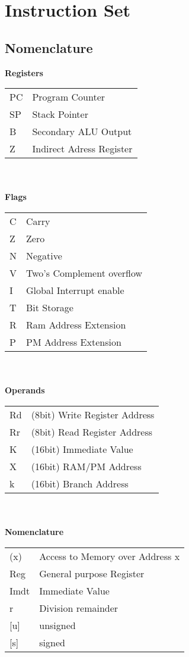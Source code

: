 \newpage
{}
\section{Instruction Set} \label{section:instruction-set}
\subsection{Nomenclature}
\begin{doublespace}
    \textbf{Registers}\\
\begin{tabular}{p{10mm}p{50mm}}
    PC & Program Counter \\
    SP & Stack Pointer \\
    B & Secondary ALU Output \\
    Z & Indirect Adress Register \\
\end{tabular}\\~\\
\textbf{Flags}\\
\begin{tabular}{p{10mm}p{50mm}}
    C & Carry \\
    Z & Zero \\
    N & Negative \\
    V & Two's Complement overflow \\
    I & Global Interrupt enable \\
    T & Bit Storage \\
    R & Ram Address Extension \\
    P & PM Address Extension \\
\end{tabular}\\~\\
\textbf{Operands}\\
\begin{tabular}{p{10mm}p{50mm}}
    Rd & (8bit) Write Register Address \\
    Rr & (8bit) Read Register Address\\
    K & (16bit) Immediate Value\\
    X & (16bit) RAM/PM Address \\
    k & (16bit) Branch Address \\
\end{tabular}\\~\\
\textbf{Nomenclature}\\
\begin{tabular}{p{10mm}p{70mm}}
    (x) & Access to Memory over Address x \\ 
    Reg & General purpose Register \\
    Imdt & Immediate Value \\
    r & Division remainder \\
    {[}u{]} & unsigned \\
    {[}s{]} & signed \\
\end{tabular}
\end{doublespace}

